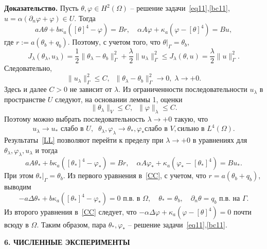 \documentclass[12pt]{article}
\begin{document}
        {\bf Доказательство.}
    Пусть $\theta,\varphi\in H^2(\Omega)$ -- решение задачи~\eqref{eq11},\eqref{bc11},
    $u=\alpha(\partial_n\varphi+\varphi)\in U.$ Тогда
    $$
    a A \theta + b \kappa_a ([\theta]^4 - \varphi ) = Br,\quad
    \alpha A \varphi + \kappa_a (\varphi - [\theta]^4)  = Bu,
    $$
    где $r:=a(\theta_b+q_b).$ Поэтому, с учетом того, что $\theta|_\Gamma=\theta_b$,
    $$
    J_\lambda(\theta_\lambda, u_\lambda) = \frac{1}{2}\|\theta_\lambda -\theta_b\|^2_\Gamma
    + \frac{\lambda}{2}\|u_\lambda\|^2_\Gamma\leq J_\lambda(\theta, u)=\frac{\lambda}{2}\|u\|^2_\Gamma.
    $$
    Следовательно,
    $$
    \|u_\lambda\|^2_\Gamma\leq C,\;\; \|\theta_\lambda -\theta_b\|^2_\Gamma\to 0,\; \lambda\to +0.
    $$
    Здесь и далее $C>0$ не зависит от $\lambda.$
    Из ограниченности последовательности $u_\lambda$ в пространстве $U$ следуют, на основании
    леммы 1, оценки
    $$
    \|\theta_\lambda\|_V \leq C,\;\;
    \|\varphi\|_\lambda \leq C.
    $$
    Поэтому можно выбрать последовательность $\lambda\to+0$ такую, что
    \begin{equation}
        \label{LL}
        u_\lambda \rightarrow u_* \text{  слабо в } U, \;\;
        \theta_\lambda, \varphi_\lambda \rightarrow \theta_*,\varphi_* \text{
            слабо в } V, \text{
            сильно в } L^4(\Omega).
    \end{equation}
    Результаты~\eqref{LL} позволяют перейти к пределу при $\lambda\to+0$
    в уравнениях для $\theta_\lambda,\varphi_\lambda,u_\lambda$ и тогда
    \begin{equation}
        \label{CC}
        a A \theta_* + b \kappa_a ([\theta_*]^4 - \varphi_* ) = Br,\quad
        \alpha A \varphi_* + \kappa_a (\varphi_* - [\theta_*]^4)  = Bu_*.
    \end{equation}
    При этом $\theta_*|_\Gamma=\theta_b.$
    Из первого уравнения в~\eqref{CC}, с учетом, что $r=a(\theta_b+q_b)$,
    выводим
    $$
    - a\Delta\theta_* + b\kappa_a([\theta_*]^4- \varphi_*)=0 \text{ п.в. в }\Omega,\quad \theta_*=\theta_b,\quad
    \partial_n\theta = q_b \text{ п.в. на  }\Gamma.
    $$
    Из второго уравнения в~\eqref{CC} следует, что $-\alpha \Delta \varphi +
    \kappa_a(\varphi-[\theta]^4)=0$ почти всюду в $\Omega.$ Таким образом,
    пара $\theta_*,\varphi_*$ -- решение задачи~\eqref{eq11},\eqref{bc11}.




    \begin{center}
        \textbf{6. ЧИСЛЕННЫЕ ЭКСПЕРИМЕНТЫ}
    \end{center}
\end{document}
